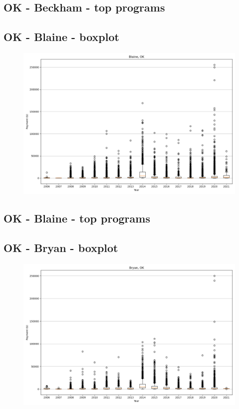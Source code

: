 \subsection*{OK - Beckham - top programs}

\newpage
\subsection*{OK - Blaine - boxplot}
\begin{figure}[h]
\centering
\includegraphics[width=7in]{../output/boxplots/counties/Blaine-OK_boxplot.png}
\end{figure}


\subsection*{OK - Blaine - top programs}

\newpage
\subsection*{OK - Bryan - boxplot}
\begin{figure}[h]
\centering
\includegraphics[width=7in]{../output/boxplots/counties/Bryan-OK_boxplot.png}
\end{figure}


